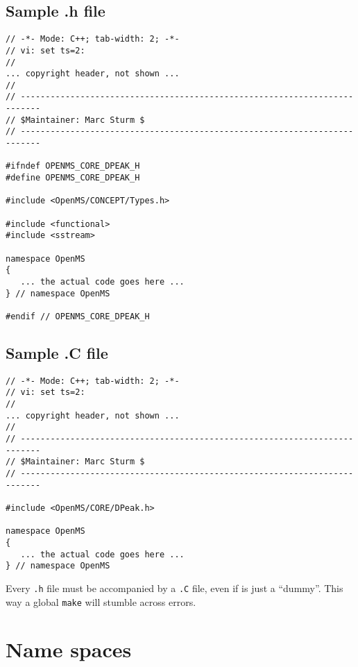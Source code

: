 \documentclass[a4]{article}
\begin{document}
\subsection{Sample .h file}

\begin{footnotesize}
\begin{verbatim}
// -*- Mode: C++; tab-width: 2; -*-
// vi: set ts=2:
//
... copyright header, not shown ...
//
// --------------------------------------------------------------------------
// $Maintainer: Marc Sturm $
// --------------------------------------------------------------------------

#ifndef OPENMS_CORE_DPEAK_H
#define OPENMS_CORE_DPEAK_H

#include <OpenMS/CONCEPT/Types.h>

#include <functional>
#include <sstream>

namespace OpenMS
{
   ... the actual code goes here ...
} // namespace OpenMS

#endif // OPENMS_CORE_DPEAK_H
\end{verbatim}
\end{footnotesize}

\subsection{Sample .C file}

\begin{footnotesize}
\begin{verbatim}
// -*- Mode: C++; tab-width: 2; -*-
// vi: set ts=2:
//
... copyright header, not shown ...
//
// --------------------------------------------------------------------------
// $Maintainer: Marc Sturm $
// --------------------------------------------------------------------------

#include <OpenMS/CORE/DPeak.h>

namespace OpenMS
{
   ... the actual code goes here ...
} // namespace OpenMS

\end{verbatim}
\end{footnotesize}
Every \texttt{.h} file must be accompanied by a \texttt{.C} file, even if is
just a ``dummy''.  This way a global \texttt{make} will
stumble across errors.


\section{Name spaces}
\end{document}
